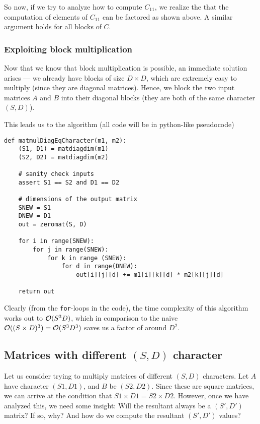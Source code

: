 \documentclass[11pt]{article}
\begin{document}
So now, if we try to analyze how to compute $C_{11}$, we realize the that
the computation of elements of $C_{11}$ can be factored as shown above. A
similar argument holds for all blocks of $C$.

\subsubsection{Exploiting block multiplication}

Now that we know that block multiplication is possible, an immediate solution
arises --- we already have blocks of size $D \times D$, which are extremely
easy to multiply (since they are diagonal matrices). Hence, we block the two
input matrices $A$ and $B$ into their diagonal blocks (they are both of the
same character $(S, D)$).

This leads us to the algorithm (all code will be in python-like pseudocode)
\newpage
\begin{verbatim}
def matmulDiagEqCharacter(m1, m2):
    (S1, D1) = matdiagdim(m1)
    (S2, D2) = matdiagdim(m2)

    # sanity check inputs
    assert S1 == S2 and D1 == D2

    # dimensions of the output matrix
    SNEW = S1
    DNEW = D1
    out = zeromat(S, D)

    for i in range(SNEW):
        for j in range(SNEW):
            for k in range (SNEW):
                for d in range(DNEW):
                    out[i][j][d] += m1[i][k][d] * m2[k][j][d]

    return out
\end{verbatim}

Clearly (from the \texttt{for}-loops in the code), the time complexity of this
algorithm works out to $\mathcal{O}(S^3D)$, which in comparison to the naive
$\mathcal{O}((S \times D)^3) = \mathcal{O}(S^3 D^3)$ saves us a factor of around $D^2$.

\subsection{Matrices with different $(S, D)$ character}
Let us consider trying to multiply matrices of different $(S, D)$ characters.
Let $A$ have character $(S1, D1)$, and $B$ be $(S2, D2)$. Since these
are square matrices, we can arrive at the condition that $S1 \times D1 = S2
\times D2$.
However, once we have analyzed this, we need some insight: Will the resultant
always be a $(S', D')$ matrix? If so, why? And how do we compute the resultant
$(S', D')$ values?
\end{document}
